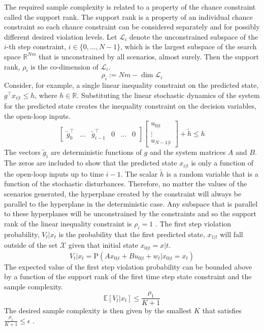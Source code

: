 \documentclass[12 pt]{report}
\begin{document}
The required sample complexity is related to a property of the chance constraint called the support rank. The support rank is a property of an individual chance constraint so each chance constraint can be considered separately and for possibly different desired violation levels. Let $\mathcal{L}_i$ denote the unconstrained subspace of the $i$-th step constraint, $i \in \{0,\dots,N-1\}$, which is the largest subspace of the search space $\mathbb{R}^{Nm}$ that is unconstrained by all scenarios, almost surely. Then the support rank, $\rho_i$ is the co-dimension of $\mathcal{L}_i$. $$ \rho_i := Nm - \dim \mathcal{L}_i$$
Consider, for example, a single linear inequality constraint on the predicted state, $ g^\top x_{i|t} \leq h$, where $h \in \mathbb{R}$. Substituting the linear stochastic dynamics of the system for the predicted state creates the inequality constraint on the decision variables, the open-loop inputs.
\begin{displaymath}
\begin{bmatrix}
\tilde{g}_{0}^\top & \dots & \tilde{g}_{i-1}^\top & 0 & \dots & 0 
\end{bmatrix}
\begin{bmatrix}
u_{0|t} \\ \vdots \\ u_{N-1|t}
\end{bmatrix} + \tilde{h} \leq h
\end{displaymath}
The vectors $\tilde{g}_i$ are deterministic functions of $g$ and the system matrices $A$ and $B$. The zeros are included to show that the predicted state $x_{i|t}$ is only a function of the open-loop inputs up to time $i-1$. The scalar $\tilde{h}$ is a random variable that is a function of the stochastic disturbances. Therefore, no matter the values of the scenarios generated, the hyperplane created by the constraint will always be parallel to the hyperplane in the deterministic case. Any subspace that is parallel to these hyperplanes will be unconstrained by the constraints and so the support rank of the linear inequality constraint is $\rho_i = 1$ \cite{schildbach13}.
The first step violation probability, $V_t|x_t$ is the probability that the first predicted state, $x_{1|t}$ will fall outside of the set $\mathcal{X}$ given that initial state $x_{0|t} = x|t$. $$V_t|x_t = \mathrm{P}\left( Ax_{0|t} + Bu_{0|t} + w_{t} | x_{0|t} = x_t \right) $$
The expected value of the first step violation probability can be bounded above by a function of the support rank of the first time step state constraint and the sample complexity. $$ \mathbb{E} \left[ V_t|x_t \right] \leq \frac{\rho_1}{K+1} $$
The desired sample complexity is then given by the smallest $K$ that satisfies $ \frac{\rho_1}{K+1} \leq \epsilon $ \cite{schildbach14}.
\end{document}
